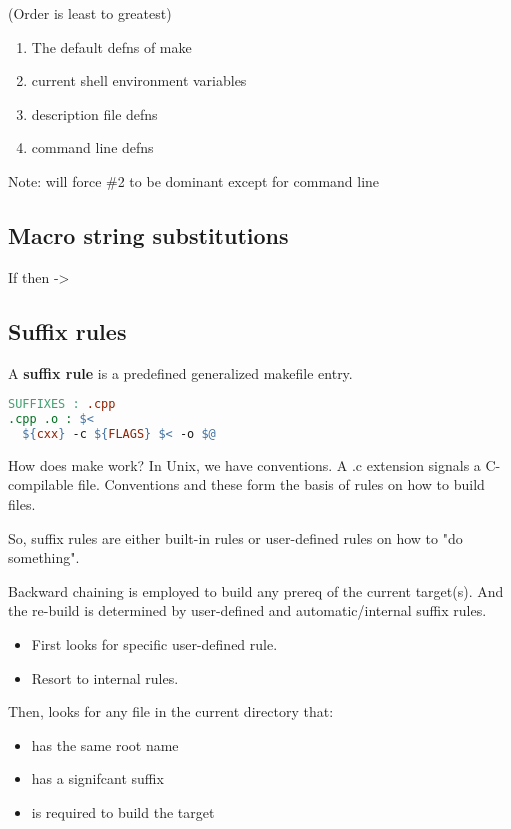 (Order is least to greatest)

\begin{enumerate}
  \item The default defns of make
  \item current shell environment variables
  \item description file defns
  \item command line defns
\end{enumerate}

Note:  will force \#2 to be dominant except for command line

\subsection{Macro string substitutions}

If  then  -> 

\subsection{Suffix rules}

A \textbf{suffix rule} is a predefined generalized makefile entry.

\begin{lstlisting}[language=make]
SUFFIXES : .cpp
.cpp .o : $<
  ${cxx} -c ${FLAGS} $< -o $@
\end{lstlisting}

How does make work? In Unix, we have conventions. A .c extension signals a C-compilable file. Conventions and these form the basis of rules on how to build files. 

So, suffix rules are either built-in rules or user-defined rules on how to "do something".

Backward chaining is employed to build any prereq of the current target(s). And the re-build is determined by user-defined and automatic/internal suffix rules.

\begin{itemize}
  \item First looks for specific user-defined rule.
  \item Resort to internal rules.
\end{itemize}

Then,  looks for any file in the current directory that:

\begin{itemize}
  \item has the same root name
  \item has a signifcant suffix
  \item is required to build the target
\end{itemize}